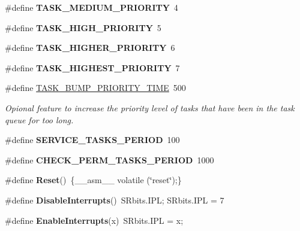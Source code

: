 \begin{DoxyCompactItemize}
\item 
\hypertarget{group__task_gad392367bc7666b7a60026cbbecfe95b0}{\#define {\bfseries T\+A\+S\+K\+\_\+\+M\+E\+D\+I\+U\+M\+\_\+\+P\+R\+I\+O\+R\+I\+T\+Y}~4}\label{group__task_gad392367bc7666b7a60026cbbecfe95b0}

\item 
\hypertarget{group__task_gae54c48fb126dde96cb1d3b16e892a887}{\#define {\bfseries T\+A\+S\+K\+\_\+\+H\+I\+G\+H\+\_\+\+P\+R\+I\+O\+R\+I\+T\+Y}~5}\label{group__task_gae54c48fb126dde96cb1d3b16e892a887}

\item 
\hypertarget{group__task_gaf6dd0020d0012ef5d7c5733c16c4106c}{\#define {\bfseries T\+A\+S\+K\+\_\+\+H\+I\+G\+H\+E\+R\+\_\+\+P\+R\+I\+O\+R\+I\+T\+Y}~6}\label{group__task_gaf6dd0020d0012ef5d7c5733c16c4106c}

\item 
\hypertarget{group__task_gae88a6bfaed2d8a80136804a8b0ac326a}{\#define {\bfseries T\+A\+S\+K\+\_\+\+H\+I\+G\+H\+E\+S\+T\+\_\+\+P\+R\+I\+O\+R\+I\+T\+Y}~7}\label{group__task_gae88a6bfaed2d8a80136804a8b0ac326a}

\item 
\#define \hyperlink{group__task_gaa96ae0d55ded50eac007bcd86332da47}{T\+A\+S\+K\+\_\+\+B\+U\+M\+P\+\_\+\+P\+R\+I\+O\+R\+I\+T\+Y\+\_\+\+T\+I\+M\+E}~500
\begin{DoxyCompactList}\small\item\em Opional feature to increase the priority level of tasks that have been in the task queue for too long. \end{DoxyCompactList}\item 
\hypertarget{group__task_gab6938b93bb3199ca2f558dc2732796a4}{\#define {\bfseries S\+E\+R\+V\+I\+C\+E\+\_\+\+T\+A\+S\+K\+S\+\_\+\+P\+E\+R\+I\+O\+D}~100}\label{group__task_gab6938b93bb3199ca2f558dc2732796a4}

\item 
\hypertarget{group__task_ga0eb80432a5c1dfa93816729659c0e6bd}{\#define {\bfseries C\+H\+E\+C\+K\+\_\+\+P\+E\+R\+M\+\_\+\+T\+A\+S\+K\+S\+\_\+\+P\+E\+R\+I\+O\+D}~1000}\label{group__task_ga0eb80432a5c1dfa93816729659c0e6bd}

\item 
\hypertarget{group__task_ga92b3099e50f63f0f06119e71a5ff2bab}{\#define {\bfseries Reset}()~\{\+\_\+\+\_\+asm\+\_\+\+\_\+ volatile (\char`\"{}reset\char`\"{});\}}\label{group__task_ga92b3099e50f63f0f06119e71a5ff2bab}

\item 
\hypertarget{group__task_ga2a42220c4bdacd910f07473ff74f9b46}{\#define {\bfseries Disable\+Interrupts}()~S\+Rbits.\+I\+P\+L; S\+Rbits.\+I\+P\+L = 7}\label{group__task_ga2a42220c4bdacd910f07473ff74f9b46}

\item 
\hypertarget{group__task_ga69ec92fe0ab4fb37b89f4c12b2a32a46}{\#define {\bfseries Enable\+Interrupts}(x)~S\+Rbits.\+I\+P\+L = x;}\label{group__task_ga69ec92fe0ab4fb37b89f4c12b2a32a46}

\end{DoxyCompactItemize}

